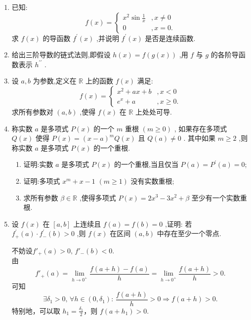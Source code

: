 \begin{enumerate}
    \item[1.]已知:
    \[f(x)=
        \begin{cases}
            x^2\sin\frac{1}{x} &,x\neq 0\\
            0 &,x=0.
        \end{cases}
    \]
    求 $f(x)$ 的导函数 $\displaystyle f^{\prime}(x)$ ,并说明 $\displaystyle f^{\prime}(x)$ 是否是连续函数.
    \item[2.]给出三阶导数的链式法则,即假设 $h(x) = f(g(x))$ ,用 $f$ 与 $g$ 的各阶导函数表示 $h^{\prime \prime}$ .
    \item[3.]设 $a,b$ 为参数,定义在 $\mathbb{R}$ 上的函数 $f(x)$ 满足:
    \[f(x)=
        \begin{cases}
            x^2+ax+b &,x<0\\
            e^x+a &,x\geq0.
        \end{cases}
    \]
    求所有参数对 $(a,b)$ ,使得 $f(x)$ 在 $\mathbb{R}$ 上处处可导.
    \item[4.]称实数 $a$ 是多项式 $P(x)$ 的一个 $m$ 重根 $(m\geq 0)$ ,
    如果存在多项式 $Q(x)$ 使得 $\displaystyle P(x) = (x - a)^{m}Q(x)$ 且 $Q(a)\neq 0$ .
    其中如果 $m\geq 2$ ,则称实数 $a$ 是多项式 $P(x)$ 的一个重根.
    \begin{enumerate}
        \item[(a)]证明:实数 $a$ 是多项式 $P(x)$ 的一个重根,当且仅当 $\displaystyle P(a) = P^{\prime}(a) = 0$;
        \item[(b)]证明:多项式 $\displaystyle x^{m} + x - 1$ $(m\geq 1)$ 没有实数重根;
        \item[(c)]求所有参数 $\displaystyle \beta \in \mathbb{R}$ ,使得多项式 $\displaystyle P(x) = 2x^{3} - 3x^{2} + \beta$ 至少有一个实数重根.
    \end{enumerate}
    \item[5.]设 $f(x)$ 在 $[a,b]$ 上连续且 $f(a) = f(b) = 0$ ,证明:
    若 $\displaystyle f_{+}^{\prime}(a)\cdot f_{-}^{\prime}(b) > 0$ ,则 $f(x)$ 在区间 $(a,b)$ 中存在至少一个零点.
    \begin{solution}
        不妨设$f'_+(a)>0,\,f'_-(b)<0$.\\
        由
        \[
        f'_+(a)=\lim_{h\to 0^+}\frac{f(a+h)-f(a)}{h}=\lim_{h\to 0^+}\frac{f(a+h)}{h}>0.
        \]
        可知
        \[
        \exists \delta_{1}>0,\,\forall h\in(0,\delta_{1}):\,\frac{f(a+h)}{h}>0\Rightarrow f(a+h)>0.
        \]
        特别地，可以取 $\displaystyle h_{1}=\frac{\delta_{1}}{2}$，则 $f(a+h_{1})>0$.\\

\end{solution}
\end{enumerate}
